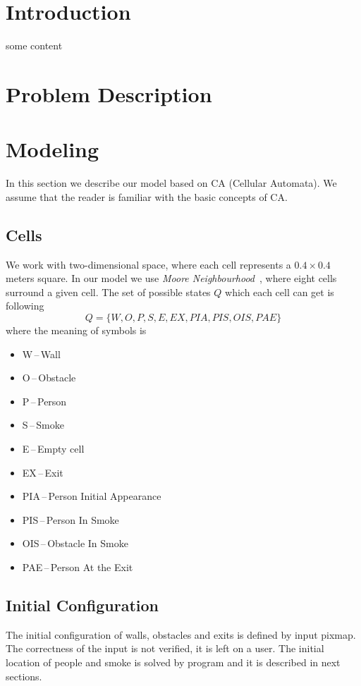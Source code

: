\section{Introduction}
some content~\cite{CaEvac}

\section{Problem Description}

\section{Modeling}
In this section we describe our model based on CA (Cellular Automata). We
assume that the reader is familiar with the basic concepts of CA.

\subsection{Cells}
We work with two-dimensional space, where each cell represents a $0.4 \times
0.4$ meters square. In our model we use \emph{Moore
Neighbourhood}~\cite{Moore}, where eight cells surround a given cell.
The set of possible states $Q$ which each cell can get is following
$$Q = \{W,O,P,S,E,EX,PIA,PIS,OIS,PAE\}$$ where the meaning of symbols
is
\begin{itemize}
    \item W\,--\,Wall
    \item O\,--\,Obstacle
    \item P\,--\,Person
    \item S\,--\,Smoke
    \item E\,--\,Empty cell
    \item EX\,--\,Exit
    \item PIA\,--\,Person Initial Appearance
    \item PIS\,--\,Person In Smoke
    \item OIS\,--\,Obstacle In Smoke
    \item PAE\,--\,Person At the Exit
\end{itemize}

\subsection{Initial Configuration}
The initial configuration of walls, obstacles and exits is defined by input
pixmap. The correctness  of the input is not verified, it is left on a user.
The initial location of people and smoke is solved by program and it is
described in next sections.

